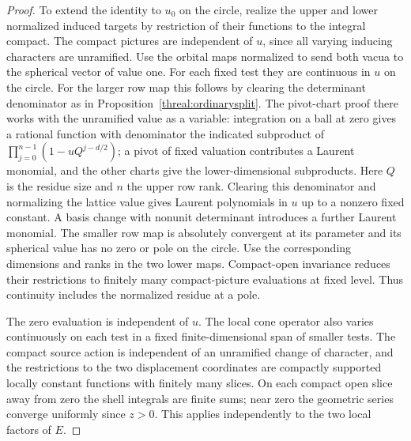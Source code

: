 \begin{proof}
To extend the identity to \(u_0\) on the circle, realize the upper
and lower normalized induced targets by restriction of their functions
to the integral compact. The compact pictures are independent of
\(u\), since all varying inducing characters are unramified. Use
the orbital maps normalized to send both vacua to the spherical
vector of value one. For each fixed test they are continuous in
\(u\) on the circle. For the larger row map this follows by clearing
the determinant denominator as in Proposition~\ref{threal:ordinarysplit}.
The pivot-chart proof there works with the unramified value as a
variable: integration on a ball at zero gives a rational function
with denominator the indicated subproduct of
\(\prod_{j=0}^{n-1}(1-u Q^{j-d/2})\); a pivot of fixed valuation
contributes a Laurent monomial, and the other charts give the
lower-dimensional subproducts. Here \(Q\) is the residue size
and \(n\) the upper row rank. Clearing this denominator and normalizing
the lattice value gives Laurent polynomials in \(u\) up to a nonzero
fixed constant. A basis change with nonunit determinant introduces
a further Laurent monomial. The smaller row map is absolutely
convergent at its parameter and its spherical value has no zero or
pole on the circle. Use the corresponding dimensions and ranks in
the two lower maps. Compact-open invariance reduces their restrictions
to finitely many compact-picture evaluations at fixed level. Thus
continuity includes the normalized residue at a pole.

The zero evaluation is independent of \(u\). The local cone operator
also varies continuously on each test in a fixed finite-dimensional
span of smaller tests. The compact source action is independent of an
unramified change of character, and the restrictions to the two
displacement coordinates are compactly supported locally constant
functions with finitely many slices. On each compact open slice
away from zero the shell integrals are finite sums; near zero the
geometric series converge uniformly since \(z>0\). This applies
independently to the two local factors of \(E\).


\end{proof}
